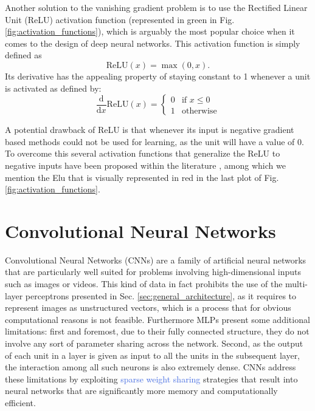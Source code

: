 Another solution to the vanishing gradient problem is to use the Rectified Linear Unit (ReLU) activation function (represented in green in Fig. \ref{fig:activation_functions}), which is arguably the most popular choice when it comes to the design of deep neural networks. This activation function is simply defined as
\begin{equation}
	\text{ReLU}(x) = \max(0,x).
\end{equation}
Its derivative has the appealing property of staying constant to 1 whenever a unit is activated as defined by: 
\begin{equation}
	\frac{\text{d}}{\text{d}x} \text{ReLU}(x) = \begin{cases} 0 & \text{if } x \leq 0 \\ 1 & \text{otherwise} \end{cases}
\end{equation}

A potential drawback of ReLU is that whenever its input is negative gradient based methods could not be used for learning, as the unit will have a value of 0. To overcome this several activation functions that generalize the ReLU to negative inputs have been proposed within the literature \cite{clevert2015fast, maas2013rectifier, he2015delving}, among which we mention the Elu \cite{clevert2015fast} that is visually represented in red in the last plot of Fig. \ref{fig:activation_functions}. 


\section{Convolutional Neural Networks}
\label{sec:convolutional_networks}

Convolutional Neural Networks (CNNs) are a family of artificial neural networks that are particularly well suited for problems involving high-dimensional inputs such as images or videos. This kind of data in fact prohibits the use of the multi-layer perceptrons presented in Sec. \ref{sec:general_architecture}, as it requires to represent images as unstructured vectors, which is a process that for obvious computational reasons is not feasible. Furthermore MLPs present some additional limitations: first and foremost, due to their fully connected structure, they do not involve any sort of parameter sharing across the network. Second, as the output of each unit in a layer is given as input to all the units in the subsequent layer, the interaction among all such neurons is also extremely dense. CNNs address these limitations by exploiting \textcolor{RoyalBlue}{sparse weight sharing} strategies that result into neural networks that are significantly more memory and computationally efficient. 


